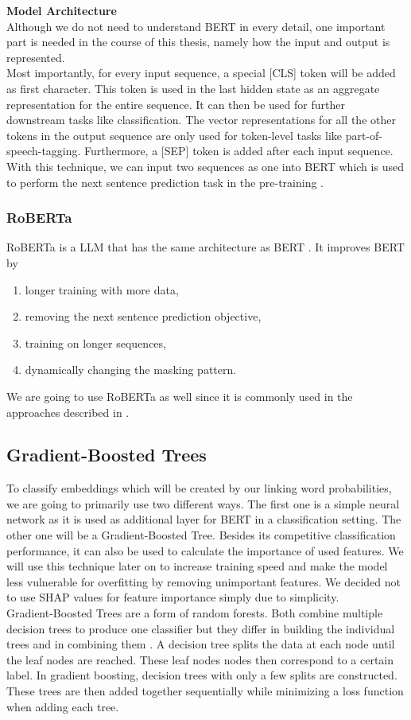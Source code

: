 \textbf{Model Architecture} \\
Although we do not need to understand BERT in every detail, one important part is needed in the course of this thesis, namely how the input and output is represented. \\
Most importantly, for every input sequence, a special [CLS] token will be added as first character. This token is used in the last hidden state as an aggregate representation for the entire sequence. It can then be used for further downstream tasks like classification. The vector representations for all the other tokens in the output sequence are only used for token-level tasks like part-of-speech-tagging. Furthermore, a [SEP] token is added after each input sequence. With this technique, we can input two sequences as one into BERT which is used to perform the next sentence prediction task in the pre-training \cite{bert}.


\subsubsection{RoBERTa}
RoBERTa is a LLM that has the same architecture as BERT \cite{roberta}. It improves BERT by
\begin{enumerate}
	\item longer training with more data,
	\item removing the next sentence prediction objective,
	\item training on longer sequences,
	\item dynamically changing the masking pattern.
\end{enumerate}
We are going to use RoBERTa as well since it is commonly used in the approaches described in \cite{argsvalidnovel2022}.

\subsection{Gradient-Boosted Trees}
To classify embeddings which will be created by our linking word probabilities, we are going to primarily use two different ways. The first one is a simple neural network as it is used as additional layer for BERT in a classification setting. The other one will be a Gradient-Boosted Tree. Besides its competitive classification performance, it can also be used to calculate the importance of used features. We will use this technique later on to increase training speed and make the model less vulnerable for overfitting by removing unimportant features. We decided not to use SHAP values \cite{shap} for feature importance simply due to simplicity. \\
Gradient-Boosted Trees are a form of random forests. Both combine multiple decision trees to produce one classifier but they differ in building the individual trees and in combining them \cite{gradboost}. A decision tree splits the data at each node until the leaf nodes are reached. These leaf nodes nodes then correspond to a certain label. In gradient boosting, decision trees with only a few splits are constructed. These trees are then added together sequentially while minimizing a loss function when adding each tree.

